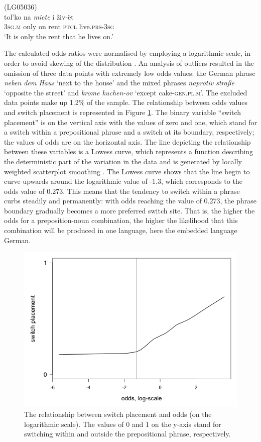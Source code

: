 \ea
(LG05036)\label{ex:5:13}\\
 {tol'ko} {na} \textit{miete} {i} {živ-ët}\\
	{3\textsc{sg.m}} only on rent \textsc{ptcl} live.\textsc{prs-3sg}\\
\glt `It is only the rent that he lives on.'
\z

The calculated odds ratios were normalised by employing a logarithmic scale, in order to avoid skewing of the distribution \citep[cf.][31]{baayen-analyzing}. An analysis of outliers \citep[cf.][258]{gries2009} resulted in the omission of three data points with extremely low odds values: the German phrase \textit{neben dem Haus} `next to the house' and the mixed phrases \textit{naprotiv straße} `opposite the street' and \textit{krome kuchen-ov} `except cake-\textsc{gen.pl.m}'. The excluded data points make up 1.2\% of the sample. The relationship between odds values and switch placement is represented in Figure \ref{fig:5:2}. The binary variable “switch placement” is on the vertical axis with the values of zero and one, which stand for a switch within a prepositional phrase and a switch at its boundary, respectively; the values of odds are on the horizontal axis. The line depicting the relationship between these variables is a Lowess curve, which represents a function describing the deterministic part of the variation in the data and is generated by locally weighted scatterplot smoothing \citep{lowess}. The Lowess curve shows that the line begin to curve upwards around the logarithmic value of -1.3, which corresponds to the odds value of 0.273. This means that the tendency to switch within a phrase curbs steadily and permanently: with odds reaching the value of 0.273, the phrase boundary gradually becomes a more preferred switch site. That is, the higher the odds for a preposition-noun combination, the higher the likelihood that this combination will be produced in one language, here the embedded language German.

\begin{figure}
	   	\includegraphics[scale=0.5]{figures/5-Figure_2.png}	
		\caption{The relationship between switch placement and odds (on the logarithmic scale). The values of 0 and 1 on the y-axis stand for switching within and outside the prepositional phrase, respectively.}
	\label{fig:5:2}
\end{figure}

